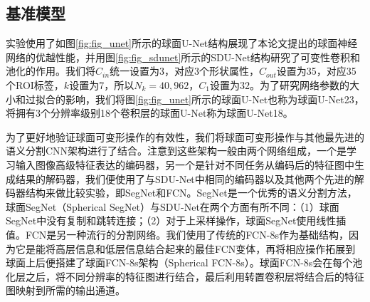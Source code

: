 \subsection{基准模型}
实验使用了如图\ref{fig:fig_unet}所示的球面U-Net结构展现了本论文提出的球面神经网络的优越性能，并用图\ref{fig:fig_sdunet}所示的SDU-Net结构研究了可变性卷积和池化的作用。我们将$C_{in}$统一设置为3，对应3个形状属性，$C_{out}$设置为35，对应35个ROI标签，$k$设置为7，所以$N_k=40,962$，$C_1$设置为32。为了研究网络参数的大小和过拟合的影响，我们将图\ref{fig:fig_unet}所示的球面U-Net也称为球面U-Net23，将拥有3个分辨率级别18个卷积层的球面U-Net称为球面U-Net18。

为了更好地验证球面可变形操作的有效性，我们将球面可变形操作与其他最先进的语义分割CNN架构进行了结合。注意到这些架构一般由两个网络组成，一个是学习输入图像高级特征表达的编码器，另一个是针对不同任务从编码后的特征图中生成结果的解码器，我们便使用了与SDU-Net中相同的编码器以及其他两个先进的解码器结构来做比较实验，即SegNet\cite{badrinarayanan2017segnet}和FCN\cite{long2015fully}。SegNet是一个优秀的语义分割方法，球面SegNet（Spherical SegNet）与SDU-Net在两个方面有所不同：（1）球面SegNet中没有复制和跳转连接；（2）对于上采样操作，球面SegNet使用线性插值。FCN是另一种流行的分割网络。我们使用了传统的FCN-8s\cite{long2015fully}作为基础结构，因为它是能将高层信息和低层信息结合起来的最佳FCN变体，再将相应操作拓展到球面上后便搭建了球面FCN-8s架构（Spherical FCN-8s）。球面FCN-8s会在每个池化层之后，将不同分辨率的特征图进行结合，最后利用转置卷积层将结合后的特征图映射到所需的输出通道。

